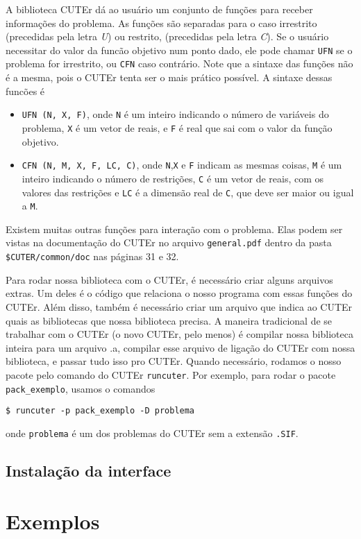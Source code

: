 \documentclass[letterpaper,11pt]{article}
\numberwithin{equation}{section}
\begin{document}
A biblioteca CUTEr dá ao usuário um conjunto de funções para receber informações do problema.
As funções são separadas para o caso irrestrito (precedidas pela letra \emph{U}) ou
restrito, (precedidas pela letra \emph{C}). Se o usuário necessitar do valor da funcão
 objetivo num ponto dado, ele pode chamar \verb+UFN+ se o problema for irrestrito, ou
\verb+CFN+ caso contrário. Note que a sintaxe das funções não é a mesma, pois o CUTEr tenta
ser o mais prático possível. A sintaxe dessas funcões é
\begin{itemize}
 \item \verb+UFN (N, X, F)+, onde \verb+N+ é um inteiro indicando o número de 
variáveis do problema, \verb+X+ é um vetor de
reais, e \verb+F+ é real que sai com o valor da função objetivo.
 \item \verb+CFN (N, M, X, F, LC, C)+, onde \verb+N+,\verb+X+ e \verb+F+ indicam as
mesmas coisas, \verb+M+ é um inteiro indicando o número de restrições, \verb+C+ é um
vetor de reais, com os valores das restrições e \verb+LC+ é a dimensão real de \verb+C+,
que deve ser maior ou igual a \verb+M+.
\end{itemize}
Existem muitas outras funções para interação com o problema. Elas podem ser vistas na
documentação do CUTEr no arquivo \verb+general.pdf+ dentro da pasta
\verb+$CUTER/common/doc+ nas páginas 31 e 32.

Para rodar nossa biblioteca com o CUTEr, é necessário criar alguns arquivos extras.
Um deles é o código que relaciona o nosso programa com essas funções do CUTEr. Além disso,
também é necessário criar um arquivo que indica ao CUTEr quais as bibliotecas que nossa
biblioteca precisa. A maneira tradicional de se trabalhar com o CUTEr (o novo CUTEr, pelo
menos) é compilar nossa biblioteca inteira para um arquivo .a, compilar esse arquivo de
ligação do CUTEr com nossa biblioteca, e passar tudo isso pro CUTEr. Quando necessário,
rodamos o nosso pacote pelo comando do CUTEr \verb+runcuter+. Por exemplo, para rodar o
pacote \verb+pack_exemplo+, usamos o comandos
\begin{verbatim}
$ runcuter -p pack_exemplo -D problema
\end{verbatim}
onde \verb+problema+ é um dos problemas do CUTEr sem a extensão \verb+.SIF+.

\subsection{Instalação da interface}

\section{Exemplos}
\end{document}
